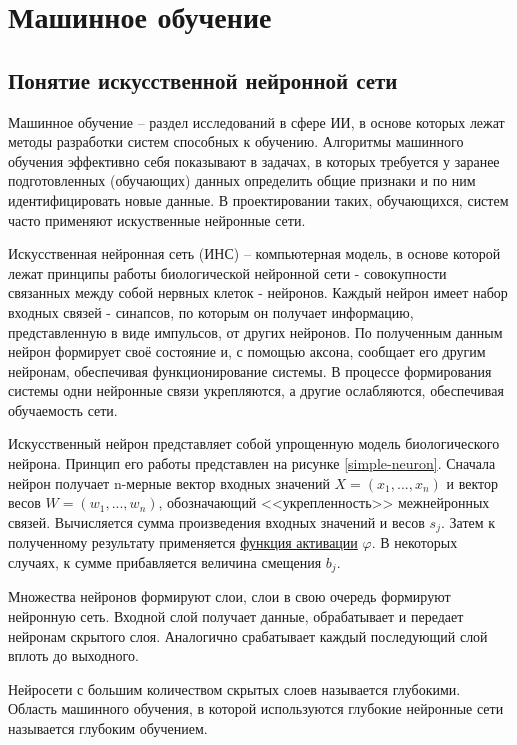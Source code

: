 \section{Машинное обучение} \label{ML}

\subsection{Понятие искусственной нейронной сети}

Машинное обучение – раздел исследований в сфере ИИ, в основе которых лежат методы разработки систем способных к обучению. Алгоритмы машинного обучения эффективно себя показывают в задачах, в которых требуется у заранее подготовленных (обучающих) данных определить общие признаки и по ним идентифицировать новые данные. В проектировании таких, обучающихся, систем часто применяют искуственные нейронные сети. 

Искусственная нейронная сеть (ИНС) – компьютерная модель, в основе которой лежат принципы работы биологической нейронной сети - совокупности связанных между собой нервных клеток - нейронов. Каждый нейрон имеет набор входных связей - синапсов, по которым он получает информацию, представленную в виде импульсов, от других нейронов. По полученным данным нейрон формирует своё состояние и, с помощью аксона, сообщает его другим нейронам, обеспечивая функционирование системы. В процессе формирования системы одни нейронные связи укрепляются, а другие ослабляются, обеспечивая обучаемость сети.

Искусственный нейрон представляет собой упрощенную модель биологического нейрона. Принцип его работы представлен на рисунке \ref{simple-neuron}. Сначала нейрон получает n-мерные вектор входных значений $X=(x_{1},...,x_{n})$ и вектор весов $W=(w_{1},...,w_{n})$, обозначающий <<укрепленность>> межнейронных связей. Вычисляется сумма произведения входных значений и весов $s_j$. Затем к полученному результату применяется \hyperref[sec:activation]{функция активации} $\varphi$. В некоторых случаях, к сумме прибавляется величина смещения $b_j$.


Множества нейронов формируют слои, слои в свою очередь формируют нейронную сеть. Входной слой получает данные, обрабатывает и передает нейронам скрытого слоя. Аналогично срабатывает каждый последующий слой вплоть до выходного. 


Нейросети с большим количеством скрытых слоев называется глубокими. Область машинного обучения, в которой используются глубокие нейронные сети называется глубоким обучением.     

